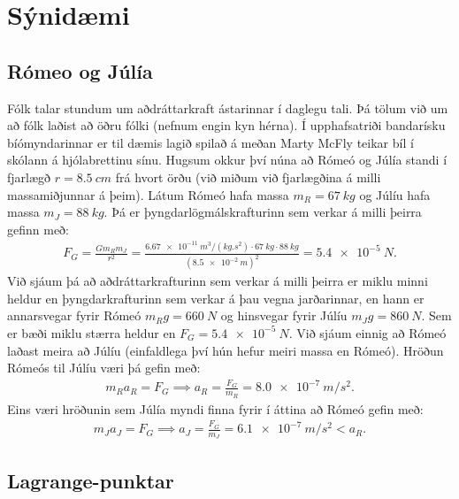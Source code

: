 \section{Sýnidæmi}

\subsection*{Rómeo og Júlía}

Fólk talar stundum um aðdráttarkraft ástarinnar í daglegu tali. Þá tölum við um að fólk laðist að öðru fólki (nefnum engin kyn hérna). Í upphafsatriði bandarísku bíómyndarinnar  er til dæmis lagið   spilað á meðan Marty McFly teikar bíl í skólann á hjólabrettinu sínu. Hugsum okkur því núna að Rómeó og Júlía standi í fjarlægð $r = \SI{8.5}{cm}$ frá hvort örðu (við miðum við fjarlægðina á milli massamiðjunnar á þeim). Látum Rómeó hafa massa $m_R = \SI{67}{kg}$ og Júlíu hafa massa $m_J = \SI{88}{kg}$. Þá er þyngdarlögmálskrafturinn sem verkar á milli þeirra gefinn með:
\begin{align*}
    F_G = \frac{Gm_R m_J}{r^2} = \frac{\SI{6.67e-11}{m^3/(kg.s^2)} \cdot \SI{67}{kg}\cdot\SI{88}{kg}}{(\SI{8.5e-2}{m})^2} = \SI{5.4e-5}{N}.
\end{align*}
Við sjáum þá að aðdráttarkrafturinn sem verkar á milli þeirra er miklu minni heldur en þyngdarkrafturinn sem verkar á þau vegna jarðarinnar, en hann er annarsvegar fyrir Rómeó $m_R g = \SI{660}{N}$ og hinsvegar fyrir Júlíu $m_Jg = \SI{860}{N}$. Sem er bæði miklu stærra heldur en $F_G = \SI{5.4e-5}{N}$. Við sjáum einnig að Rómeó laðast meira að Júlíu (einfaldlega því hún hefur meiri massa en Rómeó). Hröðun Rómeós til Júlíu væri þá gefin með:
\begin{align*}
    m_R a_R = F_G \implies a_R = \frac{F_G}{m_R} = \SI{8.0e-7}{m/s^2}.
\end{align*}
Eins væri hröðunin sem Júlía myndi finna fyrir í áttina að Rómeó gefin með:
\begin{align*}
    m_J a_J = F_G \implies a_J = \frac{F_G}{m_J} = \SI{6.1e-7}{m/s^2} < a_R.
\end{align*}

\newpage

\subsection*{Lagrange-punktar}

